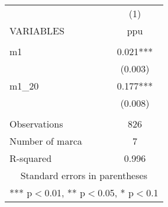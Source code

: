 \begin{tabular}{lc} \hline
 & (1) \\
VARIABLES & ppu \\ \hline
 &  \\
m1 & 0.021*** \\
 & (0.003) \\
m1\_20 & 0.177*** \\
 & (0.008) \\
 &  \\
Observations & 826 \\
Number of marca & 7 \\
 R-squared & 0.996 \\ \hline
\multicolumn{2}{c}{ Standard errors in parentheses} \\
\multicolumn{2}{c}{ *** p$<$0.01, ** p$<$0.05, * p$<$0.1} \\
\end{tabular}
